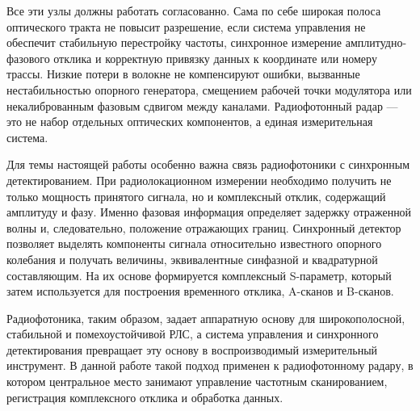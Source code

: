Все эти узлы должны работать согласованно. Сама по себе широкая полоса
оптического тракта не повысит разрешение, если система управления не обеспечит
стабильную перестройку частоты, синхронное измерение амплитудно-фазового отклика
и корректную привязку данных к координате или номеру трассы. Низкие потери
в волокне не компенсируют ошибки, вызванные нестабильностью опорного генератора,
смещением рабочей точки модулятора или некалиброванным фазовым сдвигом между
каналами. Радиофотонный радар --- это не набор отдельных оптических компонентов,
а единая измерительная система.

Для темы настоящей работы особенно важна связь радиофотоники с синхронным
детектированием. При радиолокационном измерении необходимо получить не только
мощность принятого сигнала, но и комплексный отклик, содержащий амплитуду и фазу.
Именно фазовая информация определяет задержку отраженной волны и, следовательно,
положение отражающих границ. Синхронный детектор позволяет выделять компоненты
сигнала относительно известного опорного колебания и получать величины, эквивалентные
синфазной и квадратурной составляющим. На их основе формируется комплексный
S-параметр, который затем используется для построения временного отклика, A-сканов
и B-сканов.

Радиофотоника, таким образом, задает аппаратную основу для широкополосной,
стабильной и помехоустойчивой РЛС, а система управления и синхронного
детектирования превращает эту основу в воспроизводимый измерительный инструмент.
В данной работе такой подход применен к радиофотонному радару, в котором
центральное место занимают управление частотным сканированием, регистрация
комплексного отклика и обработка данных.
